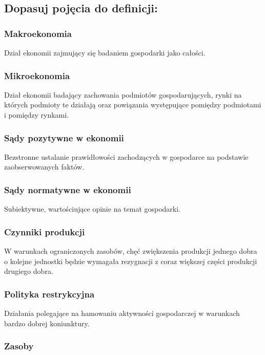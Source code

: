 \documentclass[a4paper,12pt]{article}
\begin{document}
\subsection{Dopasuj pojęcia do definicji:}

\subsubsection*{Makroekonomia}

Dział ekonomii zajmujący się badaniem gospodarki jako całości.

\subsubsection*{Mikroekonomia}

Dział ekonomii badający zachowania podmiotów gospodarujących, rynki na których podmioty te działają oraz powiązania występujące pomiędzy podmiotami i pomiędzy rynkami.

\subsubsection*{Sądy pozytywne w ekonomii}

Bezstronne ustalanie prawidłowości zachodzących w gospodarce na podstawie zaobserwowanych faktów.

\subsubsection*{Sądy normatywne w ekonomii}

Subiektywne, wartościujące opinie na temat gospodarki.

\subsubsection*{Czynniki produkcji}

W warunkach ograniczonych zasobów, chęć zwiększenia produkcji jednego dobra o kolejne jednostki będzie wymagała rezygnacji z coraz większej części produkcji drugiego dobra.

\subsubsection*{Polityka restrykcyjna}

Działania polegające na hamowaniu aktywności gospodarczej w warunkach bardzo dobrej koniunktury.

\subsubsection*{Zasoby}
\end{document}
